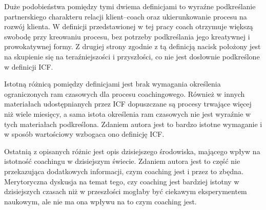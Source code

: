 Duże podobieństwa pomiędzy tymi dwiema definicjami to wyraźne podkreślanie partnerskiego charakteru relacji klient--coach
oraz ukierunkowanie procesu na rozwój klienta. W definicji przedstawionej w tej pracy coach otrzymuje większą swobodę przy kreowaniu procesu, bez
potrzeby podkreślania jego kreatywnej i prowokatywnej formy. Z drugiej strony zgodnie z tą definicją nacisk położony jest na skupienie się na
teraźniejszości i przyszłości, co nie jest dosłownie podkreślone w definicji ICF.

Istotną różnicą pomiędzy definicjami jest brak wymagania określenia ograniczonych ram czasowych dla procesu coachingowego. Również w innych materiałach
udostępnianych przez ICF dopuszczane są procesy trwające więcej niż wiele miesięcy, a sama istota określenia ram czasowych nie jest wyraźnie w tych materiałach
podkreślona. Zdaniem autora jest to bardzo istotne wymaganie i w sposób wartościowy wzbogaca ono definicję ICF.

Ostatnią z opisanych różnic jest opis dzisiejszego środowiska, mającego wpływ na istotność coachingu w dzisiejszym świecie. Zdaniem autora jest to część
nie przekazująca dodatkowych informacji, czym coaching jest i przez to zbędna. Merytoryczna dyskusja na temat tego, czy coaching jest bardziej istotny w dzisiejszych czasach
niż w przeszłości mogłaby być ciekawym eksperymentem naukowym, ale nie ma ona wpływu na to czym coaching jest.

